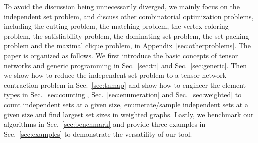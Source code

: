 \documentclass[onefignum, onetabnum]{siamart190516}
\newcommand{\<}{\langle}
\renewcommand{\>}{\rangle}
\newcommand{\Sec}[1]{Sec.~\ref{#1}}
\newcommand{\App}[1]{Appendix~\ref{#1}}
\newcommand{\xpurple}[1]{[{\bf  \color{purple}{\sout{MC: #1}}}]}
\newcounter{example}
\begin{document}

To avoid the discussion being unnecessarily diverged, we mainly focus on the independent set problem,
and discuss other combinatorial optimization problems,
including the cutting problem, the matching problem, the vertex coloring problem, the satisfiability problem, the dominating set problem, the set packing problem and the maximal clique problem, in \App{sec:otherproblems}.
The paper is organized as follows.
We first introduce the basic concepts of tensor networks and generic programming in \Sec{sec:tn} and \Sec{sec:generic}.
Then we show how to reduce the independent set problem to a tensor network contraction problem in \Sec{sec:tnmap}
and show how to engineer the element types in \Sec{sec:counting}, \Sec{sec:enumeration} and \Sec{sec:weighted} to count independent sets at a given size, enumerate/sample independent sets at a given size and find largest set sizes in weighted graphs.
Lastly, we benchmark our algorithms in \Sec{sec:benchmark} and provide three examples in \Sec{sec:examples} to demonstrate the versatility of our tool.
\end{document}

